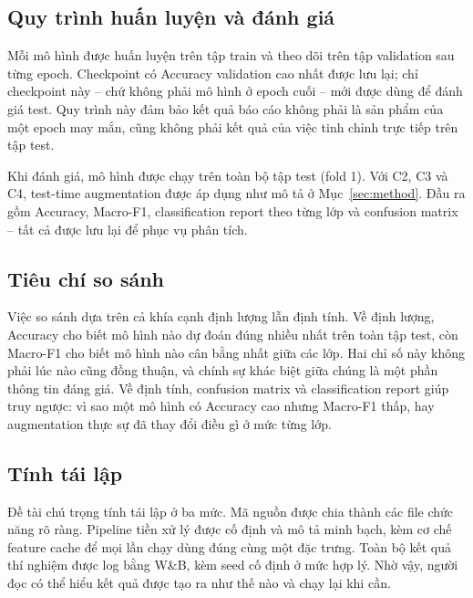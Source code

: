 \subsection{Quy trình huấn luyện và đánh giá}

Mỗi mô hình được huấn luyện trên tập train và theo dõi trên tập validation sau
từng epoch. Checkpoint có Accuracy validation cao nhất được lưu lại; chỉ checkpoint
này -- chứ không phải mô hình ở epoch cuối -- mới được dùng để đánh giá test. Quy
trình này đảm bảo kết quả báo cáo không phải là sản phẩm của một epoch may mắn,
cũng không phải kết quả của việc tinh chỉnh trực tiếp trên tập test.

Khi đánh giá, mô hình được chạy trên toàn bộ tập test (fold 1). Với C2, C3 và C4,
test-time augmentation được áp dụng như mô tả ở Mục~\ref{sec:method}. Đầu ra gồm
Accuracy, Macro-F1, classification report theo từng lớp và confusion matrix --
tất cả được lưu lại để phục vụ phân tích.

\subsection{Tiêu chí so sánh}

Việc so sánh dựa trên cả khía cạnh định lượng lẫn định tính. Về định lượng,
Accuracy cho biết mô hình nào dự đoán đúng nhiều nhất trên toàn tập test, còn
Macro-F1 cho biết mô hình nào cân bằng nhất giữa các lớp. Hai chỉ số này không
phải lúc nào cũng đồng thuận, và chính sự khác biệt giữa chúng là một phần thông
tin đáng giá. Về định tính, confusion matrix và classification report giúp truy
ngược: vì sao một mô hình có Accuracy cao nhưng Macro-F1 thấp, hay augmentation
thực sự đã thay đổi điều gì ở mức từng lớp.

\subsection{Tính tái lập}

Đề tài chú trọng tính tái lập ở ba mức. Mã nguồn được chia thành các file chức
năng rõ ràng. Pipeline tiền xử lý được cố định và mô tả minh bạch, kèm cơ chế
feature cache để mọi lần chạy dùng đúng cùng một đặc trưng. Toàn bộ kết quả thí
nghiệm được log bằng W\&B, kèm seed cố định ở mức hợp lý. Nhờ vậy, người đọc có
thể hiểu kết quả được tạo ra như thế nào và chạy lại khi cần.
